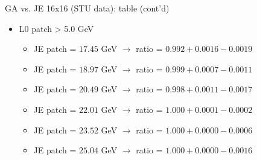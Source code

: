 \documentclass[xcolor={usenames,dvipsnames}]{beamer}
\begin{document}
\begin{frame}{GA vs. JE 16x16 (STU data): table (cont'd)}
\begin{itemize}
\item L0 patch > 5.0 GeV
\begin{itemize}
\item JE patch = $17.45$ GeV $\rightarrow$ ratio = $0.992 + 0.0016 - 0.0019$
\item JE patch = $18.97$ GeV $\rightarrow$ ratio = $0.999 + 0.0007 - 0.0011$
\item JE patch = $20.49$ GeV $\rightarrow$ ratio = $0.998 + 0.0011 - 0.0017$
\item JE patch = $22.01$ GeV $\rightarrow$ ratio = $1.000 + 0.0001 - 0.0002$
\item JE patch = $23.52$ GeV $\rightarrow$ ratio = $1.000 + 0.0000 - 0.0006$
\item JE patch = $25.04$ GeV $\rightarrow$ ratio = $1.000 + 0.0000 - 0.0016$
\end{itemize}
\end{itemize}
\end{frame}
\end{document}
